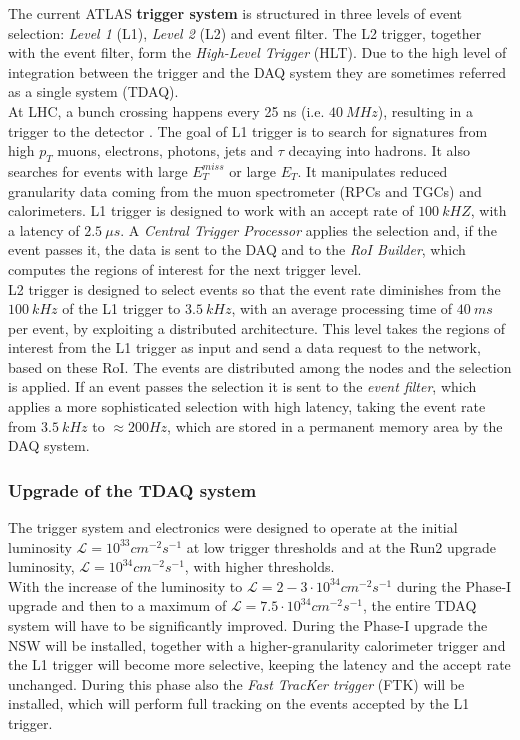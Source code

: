 \documentclass[a4paper,twoside,12pt]{article}
\begin{document}
The current ATLAS \textbf{trigger system} is structured in three levels of event selection: \textit{Level 1} (L1), \textit{Level 2} (L2) and event filter\cite{Aad:2008zzm}. The L2 trigger, together
with the event filter, form the \textit{High-Level Trigger} (HLT). Due to the high level of integration between the trigger and the DAQ system they are sometimes referred as a single system (TDAQ).\\

At LHC, a bunch crossing happens every 25 ns (i.e. $40\ MHz$), resulting in a trigger to the detector . The goal of L1 trigger is to search for signatures from high $p_{T}$ muons, electrons,
photons, jets and $\tau$ decaying into hadrons. It also searches for events with large $E_{T}^{miss}$ or large $E_{T}$. It manipulates reduced granularity data coming from the muon
spectrometer (RPCs and TGCs) and calorimeters. L1 trigger is designed to work with an accept rate of $100\ kHZ$, with a latency of $2.5\ \mu s$. A \textit{Central Trigger Processor} applies
the selection and, if the event passes it, the data is
sent to the DAQ and to the \textit{RoI Builder}, which computes the regions of interest for the next trigger level.\\
L2 trigger is designed to select events so that the event rate diminishes from the $100\ kHz$ of the L1 trigger to $3.5\ kHz$, with an average processing time of $40\ ms$ per event, by
exploiting a distributed architecture. This
level takes the regions of interest from the L1 trigger as input and send a data request to the network, based on these RoI. The events are distributed among the nodes and the selection is applied. If an event passes the selection it is sent to the \textit{event filter}, which applies a more sophisticated selection with high latency, taking the event rate from $3.5\ kHz$ to $\approx 200 Hz$, which are stored in a permanent memory area by the DAQ system.

\subsubsection*{Upgrade of the TDAQ system}
The trigger system and electronics were designed to operate at the initial luminosity 
$\mathcal{L} = 10^{33} cm^{-2}s^{-1}$ at low trigger thresholds and at the Run2 upgrade
luminosity, $\mathcal{L} = 10^{34} cm^{-2}s^{-1}$, with higher thresholds\cite{scoping}.\\

With the increase of the luminosity to $\mathcal{L} = 2-3 \cdot 10^{34} cm^{-2}s^{-1}$ during
the Phase-I upgrade and then to a maximum of $\mathcal{L} = 7.5 \cdot 10^{34} cm^{-2}s^{-1}$, the entire TDAQ system will have to be significantly improved. During the Phase-I upgrade the NSW will be installed, together with a higher-granularity calorimeter
trigger and the L1 trigger will become more selective, keeping the latency and the accept rate unchanged. During this phase also the \textit{Fast TracKer trigger} (FTK)\cite{FTK_TDR} will be installed, which will perform
full tracking on the events accepted by the L1 trigger. \\
\end{document}
